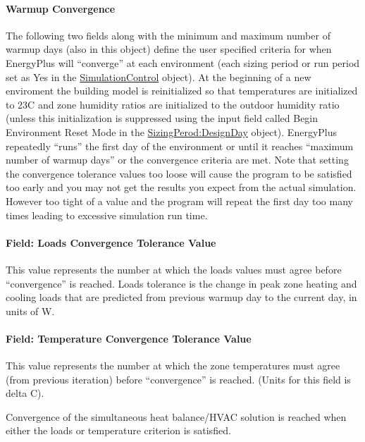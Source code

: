 \paragraph{Warmup Convergence}\label{warmup-convergence}

The following two fields along with the minimum and maximum number of warmup days (also in this object) define the user specified criteria for when EnergyPlus will ``converge'' at each environment (each sizing period or run period set as Yes in the \hyperref[simulationcontrol]{SimulationControl} object). At the beginning of a new enviroment the building model is reinitialized so that temperatures are initialized to 23C and zone humidity ratios are initialized to the outdoor humidity ratio  (unless this initialization is suppressed using the input field called Begin Environment Reset Mode in the \hyperref[sizingperioddesignday]{SizingPerod:DesignDay} object).  EnergyPlus repeatedly ``runs'' the first day of the environment or until it reaches ``maximum number of warmup days'' or the convergence criteria are met. Note that setting the convergence tolerance values too loose will cause the program to be satisfied too early and you may not get the results you expect from the actual simulation. However too tight of a value and the program will repeat the first day too many times leading to excessive simulation run time.

\paragraph{Field: Loads Convergence Tolerance Value}\label{field-loads-convergence-tolerance-value}

This value represents the number at which the loads values must agree before ``convergence'' is reached. Loads tolerance is the change in peak zone heating and cooling loads that are predicted from previous warmup day to the current day, in units of W.

\paragraph{Field: Temperature Convergence Tolerance Value}\label{field-temperature-convergence-tolerance-value}

This value represents the number at which the zone temperatures must agree (from previous iteration) before ``convergence'' is reached. (Units for this field is delta C).

Convergence of the simultaneous heat balance/HVAC solution is reached when either the loads or temperature criterion is satisfied.

